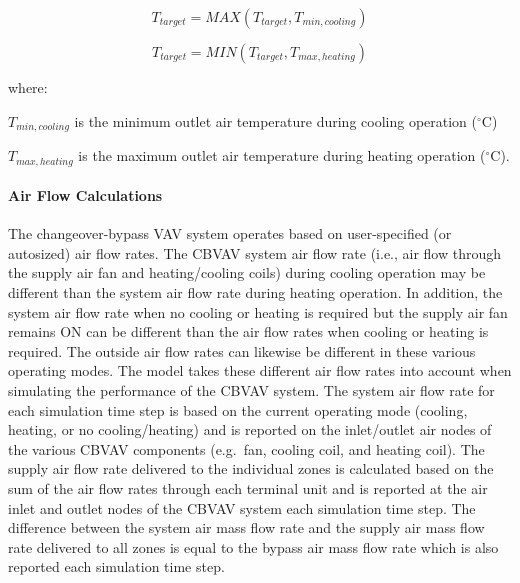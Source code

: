 \begin{equation}
{T_{target}} = MAX\left( {{T_{target}},{T_{min,cooling}}} \right)
\end{equation}

\begin{equation}
{T_{target}} = MIN\left( {{T_{target}},{T_{max,heating}}} \right)
\end{equation}

where:

\({T_{min,cooling}}\) is the minimum outlet air temperature during cooling operation (\(^{\circ}\)C)

\({T_{max,heating}}\) is the maximum outlet air temperature during heating operation (\(^{\circ}\)C).

\paragraph{Air Flow Calculations}\label{air-flow-calculations}

The changeover-bypass VAV system operates based on user-specified (or autosized) air flow rates. The CBVAV system air flow rate (i.e., air flow through the supply air fan and heating/cooling coils) during cooling operation may be different than the system air flow rate during heating operation. In addition, the system air flow rate when no cooling or heating is required but the supply air fan remains ON can be different than the air flow rates when cooling or heating is required. The outside air flow rates can likewise be different in these various operating modes. The model takes these different air flow rates into account when simulating the performance of the CBVAV system. The system air flow rate for each simulation time step is based on the current operating mode (cooling, heating, or no cooling/heating) and is reported on the inlet/outlet air nodes of the various CBVAV components (e.g.~fan, cooling coil, and heating coil). The supply air flow rate delivered to the individual zones is calculated based on the sum of the air flow rates through each terminal unit and is reported at the air inlet and outlet nodes of the CBVAV system each simulation time step. The difference between the system air mass flow rate and the supply air mass flow rate delivered to all zones is equal to the bypass air mass flow rate which is also reported each simulation time step.

